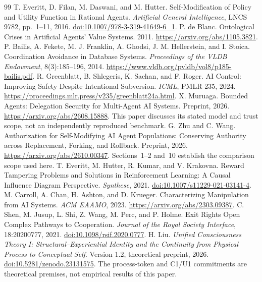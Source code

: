 \begin{thebibliography}{99}
 T. Everitt, D. Filan, M. Daswani, and M. Hutter. Self-Modification of Policy and Utility Function in Rational Agents. \emph{Artificial General Intelligence}, LNCS 9782, pp.~1--11, 2016. \href{https://doi.org/10.1007/978-3-319-41649-6_1}{doi:10.1007/978-3-319-41649-6\_1}.
 P. de Blanc. Ontological Crises in Artificial Agents' Value Systems. 2011. \url{https://arxiv.org/abs/1105.3821}.
 P. Bailis, A. Fekete, M. J. Franklin, A. Ghodsi, J. M. Hellerstein, and I. Stoica. Coordination Avoidance in Database Systems. \emph{Proceedings of the VLDB Endowment}, 8(3):185--196, 2014. \url{https://www.vldb.org/pvldb/vol8/p185-bailis.pdf}.
 R. Greenblatt, B. Shlegeris, K. Sachan, and F. Roger. AI Control: Improving Safety Despite Intentional Subversion. \emph{ICML}, PMLR 235, 2024. \url{https://proceedings.mlr.press/v235/greenblatt24a.html}.
 X. Muruaga. Bounded Agents: Delegation Security for Multi-Agent AI Systems. Preprint, 2026. \url{https://arxiv.org/abs/2608.15888}. This paper discusses its stated model and trust scope, not an independently reproduced benchmark.
 G. Zhu and C. Wang. Authorization for Self-Modifying AI Agent Populations: Conserving Authority across Replacement, Forking, and Rollback. Preprint, 2026. \url{https://arxiv.org/abs/2610.00347}. Sections~1--2 and~10 establish the comparison scope used here.
 T. Everitt, M. Hutter, R. Kumar, and V. Krakovna. Reward Tampering Problems and Solutions in Reinforcement Learning: A Causal Influence Diagram Perspective. \emph{Synthese}, 2021. \href{https://doi.org/10.1007/s11229-021-03141-4}{doi:10.1007/s11229-021-03141-4}.
 M. Carroll, A. Chan, H. Ashton, and D. Krueger. Characterizing Manipulation from AI Systems. \emph{ACM EAAMO}, 2023. \url{https://arxiv.org/abs/2303.09387}.
 C. Shen, M. Jusup, L. Shi, Z. Wang, M. Perc, and P. Holme. Exit Rights Open Complex Pathways to Cooperation. \emph{Journal of the Royal Society Interface}, 18:20200777, 2021. \href{https://doi.org/10.1098/rsif.2020.0777}{doi:10.1098/rsif.2020.0777}.
 H. Liu. \emph{Unified Consciousness Theory I: Structural--Experiential Identity and the Continuity from Physical Process to Conceptual Self}. Version 1.2, theoretical preprint, 2026. \href{https://doi.org/10.5281/zenodo.23131575}{doi:10.5281/zenodo.23131575}. The process-token and C1/U1 commitments are theoretical premises, not empirical results of this paper.
\end{thebibliography}

